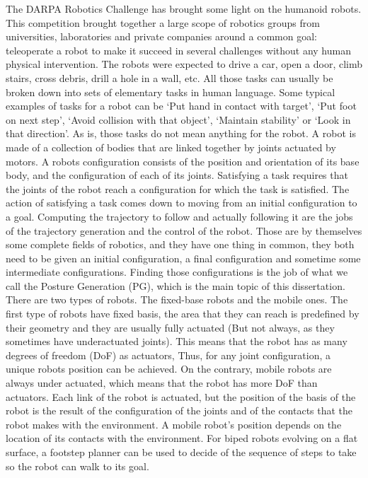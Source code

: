 The DARPA Robotics Challenge has brought some light on the humanoid robots.
This competition brought together a large scope of robotics groups from universities, laboratories and private companies around a common goal: teleoperate a robot to make it succeed in several challenges without any human physical intervention.
The robots were expected to drive a car, open a door, climb stairs, cross debris, drill a hole in a wall, etc.
All those tasks can usually be broken down into sets of elementary tasks in human language.
Some typical examples of tasks for a robot can be `Put hand in contact with target', `Put foot on next step', `Avoid collision with that object', `Maintain stability' or `Look in that direction'.
As is, those tasks do not mean anything for the robot.
A robot is made of a collection of bodies that are linked together by joints actuated by motors.
A robots configuration consists of the position and orientation of its base body, and the configuration of each of its joints.
Satisfying a task requires that the joints of the robot reach a configuration for which the task is satisfied.
The action of satisfying a task comes down to moving from an initial configuration to a goal.
Computing the trajectory to follow and actually following it are the jobs of the trajectory generation and the control of the robot.
Those are by themselves some complete fields of robotics, and they have one thing in common, they both need to be given an initial configuration, a final configuration and sometime some intermediate configurations.
Finding those configurations is the job of what we call the Posture Generation (PG), which is the main topic of this dissertation.
\newline There are two types of robots. The fixed-base robots and the mobile ones.
The first type of robots have fixed basis, the area that they can reach is predefined by their geometry and they are usually fully actuated (But not always, as they sometimes have underactuated joints).
This means that the robot has as many degrees of freedom (DoF) as actuators, Thus, for any joint configuration, a unique robots position can be achieved.
On the contrary, mobile robots are always under actuated, which means that the robot has more DoF than actuators.
Each link of the robot is actuated, but the position of the basis of the robot is the result of the configuration of the joints and of the contacts that the robot makes with the environment.
A mobile robot's position depends on the location of its contacts with the environment.
For biped robots evolving on a flat surface, a footstep planner can be used to decide of the sequence of steps to take so the robot can walk to its goal.

